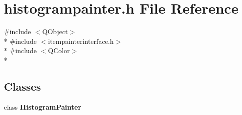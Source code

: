 \section{histogrampainter.\+h File Reference}
\label{bk3_2curve_2painters_2histogrampainter_8h}
{\ttfamily \#include $<$Q\+Object$>$}\\*
{\ttfamily \#include $<$itempainterinterface.\+h$>$}\\*
{\ttfamily \#include $<$Q\+Color$>$}\\*
\subsection*{Classes}
\begin{DoxyCompactItemize}
\item 
class {\bf Histogram\+Painter}
\end{DoxyCompactItemize}
